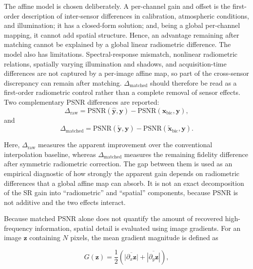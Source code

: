 \documentclass[conference]{IEEEtran}
\begin{document}
The affine model is chosen deliberately. A per-channel gain and offset
is the first-order description of inter-sensor differences in
calibration, atmospheric conditions, and illumination; it has a
closed-form solution; and, being a global per-channel mapping, it
cannot add spatial structure. Hence, an advantage remaining after
matching cannot be explained by a global linear radiometric
difference. The model also has limitations. Spectral-response
mismatch, nonlinear radiometric relations, spatially varying
illumination and shadows, and acquisition-time differences are not
captured by a per-image affine map, so part of the cross-sensor
discrepancy can remain after matching.
$\Delta_{\mathrm{matched}}$ should therefore be read as a
first-order radiometric control rather than a complete removal of
sensor effects. Two complementary PSNR differences are reported:
\begin{equation}
\Delta_{\mathrm{raw}}
=
\mathrm{PSNR}(\hat{\mathbf{y}},\mathbf{y})
-
\mathrm{PSNR}(\mathbf{x}_{\mathrm{bic}},\mathbf{y}),
\label{eq:delta_raw}
\end{equation}
and
\begin{equation}
\Delta_{\mathrm{matched}}
=
\mathrm{PSNR}(\tilde{\mathbf{y}},\mathbf{y})
-
\mathrm{PSNR}(\tilde{\mathbf{x}}_{\mathrm{bic}},\mathbf{y}).
\label{eq:delta_matched}
\end{equation}

Here, $\Delta_{\mathrm{raw}}$ measures the apparent improvement over
the conventional interpolation baseline, whereas
$\Delta_{\mathrm{matched}}$ measures the remaining fidelity difference
after symmetric radiometric correction. The gap between them is used
as an empirical diagnostic of how strongly the apparent gain depends on
radiometric differences that a global affine map can absorb. It is not
an exact decomposition of the SR gain into ``radiometric'' and
``spatial'' components, because PSNR is not additive and the two
effects interact.

Because matched PSNR alone does not quantify the amount of recovered
high-frequency information, spatial detail is evaluated using image
gradients. For an image $\mathbf{z}$ containing $N$ pixels, the mean
gradient magnitude is defined as

\begin{equation}
G(\mathbf{z})
=
\frac{1}{2}\left(
\overline{|\partial_x \mathbf{z}|}
+
\overline{|\partial_y \mathbf{z}|}
\right),
\label{eq:gradient}
\end{equation}
\end{document}
